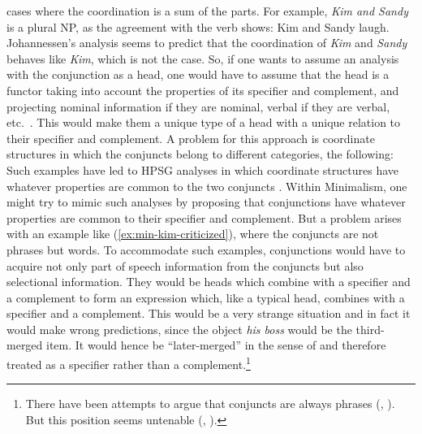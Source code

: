 \documentclass[output=paper
 	        ,biblatex
                ,babelshorthands
                ,newtxmath
                ,draftmode
                ,colorlinks, citecolor=brown
]{langscibook}
\begin{document}
cases where the coordination is a sum of the parts. For example, \emph{Kim and Sandy} is a plural
NP, as the agreement with the verb shows:
\ea
Kim and Sandy laugh.
\z
Johannessen's analysis seems to predict that the coordination of \emph{Kim} and \emph{Sandy} behaves
like \emph{Kim}, which is not the case. So, if one wants to assume an analysis with the conjunction
as a head, one would have to assume that the head is a functor taking into account the properties of
its specifier and complement, and projecting nominal information if they are nominal, verbal if they
are verbal, etc.\ \citep{Steedman91a}. This would make them a unique type of a head with a unique 
relation to their specifier and complement. A problem for this approach is coordinate structures in
which the conjuncts belong to different categories, \eg the following: 
\eal
{}\label{ex:min-hobbs-linguist}
\label{ex:min-hobbs-angry}
\zl 
Such examples have led to HPSG analyses in which coordinate structures have whatever properties are
common to the two conjuncts \citep{Sag2003a-u}. Within Minimalism, one might try to mimic such
analyses by proposing that conjunctions have whatever properties are common to their specifier and
complement. But a problem arises with an example like (\ref{ex:min-kim-criticized}), where the conjuncts are
not phrases but words.
\label{ex:min-kim-criticized}
\z
To accommodate such examples, conjunctions would have to acquire not only part of speech information
from the conjuncts but also selectional information. They would be heads which combine with a
specifier and a complement to form an expression which, like a typical head, combines with a
specifier and a complement. This would be a very strange situation and in fact it would make wrong
predictions, since the object \emph{his boss} would be the third-merged item. It would hence be
``later-merged'' in the sense of \citet[]{Chomsky2008a} and therefore treated as a specifier rather than a complement.\footnote{%
	There have been attempts to argue that conjuncts are always phrases (\citealt{Kayne94a-u}, \citealt{Bruening2018a}). But this position seems untenable (\citealt{Abeille2006a}, \citealt[Section~7]{MuellerLexicalism}).%
}
\end{document}
